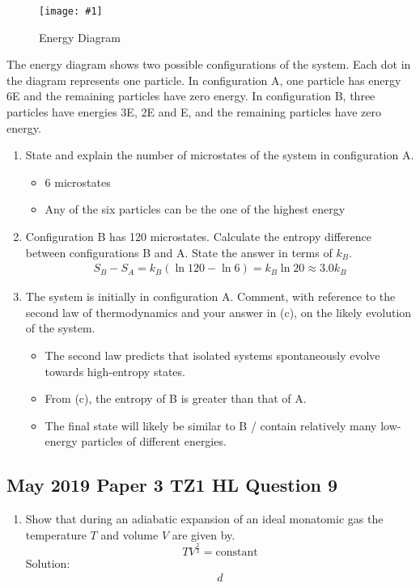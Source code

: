 \documentclass[a4paper,12pt]{article}
\newcommand{\img}[4]{\begin{center}
  \begin{figure}[H]
    \centering
    \texttt{[image: \#1]}
    \caption{#3}
    \label{fig:#4}
  \end{figure}
\end{center}}
\begin{document}
\img{ex/3.png}{0.5}{Energy Diagram}{ex3}

The energy diagram shows two possible configurations of the system. Each dot in the diagram represents one particle. In configuration A, one particle has energy 6E and the remaining particles have zero energy. In configuration B, three particles have energies 3E, 2E and E, and the remaining particles have zero energy.

\begin{enumerate}[label=(\alph*)]
  \item State and explain the number of microstates of the system in configuration A.
        \begin{itemize}
          \item 6 microstates
          \item Any of the six particles can be the one of the highest energy
        \end{itemize}
  \item Configuration B has 120 microstates. Calculate the entropy difference between configurations B and A. State the answer in terms of $k_B$.
        \begin{align*}
          S_B - S_A = k_B(\ln 120 - \ln 6) = k_B\ln 20 \approx 3.0 k_B
        \end{align*}
  \item The system is initially in configuration A. Comment, with reference to the second law of thermodynamics and your answer in (c), on the likely evolution of the system.
        \begin{itemize}
          \item The second law predicts that isolated systems spontaneously evolve towards high-entropy states.
          \item From (c), the entropy of B is greater than that of A.
          \item The final state will likely be similar to B / contain relatively many low-energy particles of different
                energies.
        \end{itemize}

\end{enumerate}

\pagebreak

\subsection{May 2019 Paper 3 TZ1 HL Question 9}

\begin{enumerate}[label=(\alph*)]
  \item Show that during an adiabatic expansion of an ideal monatomic gas the temperature $T$ and volume $V$ are given by.
        $$TV^{\frac{2}{3}} = \text{constant}$$
        Solution:
        \begin{align*}
          d
        \end{align*}
\end{enumerate}
\end{document}
